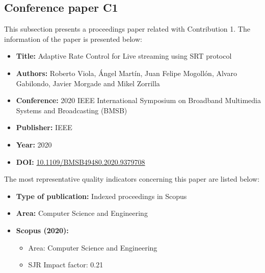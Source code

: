 \subsection{Conference paper C1}
\label{chap:BMSB2020}
This subsection presents a proceedings paper related with Contribution 1.
The information of the paper is presented below:
\begin{itemize} \itemsep1pt\parskip0pt
	\item \textbf{Title:} Adaptive Rate Control for Live streaming using SRT protocol
	\item \textbf{Authors:} Roberto Viola, \'Angel Mart\'in, Juan Felipe Mogoll\'on, Alvaro Gabilondo, Javier Morgade and Mikel Zorrilla
	\item \textbf{Conference:} 2020 IEEE International Symposium on Broadband Multimedia Systems and Broadcasting (BMSB)
	\item \textbf{Publisher:} IEEE
	\item \textbf{Year:} 2020
	\item \textbf{DOI:} \url{10.1109/BMSB49480.2020.9379708}
\end{itemize}
The most representative quality indicators concerning this paper are listed below:
\begin{itemize} \itemsep1pt\parskip0pt
	\item \textbf{Type of publication:} Indexed proceedings in Scopus
	\item \textbf{Area:} Computer Science and Engineering
	\item \textbf{Scopus (2020):}
	\begin{itemize}
		\item Area: Computer Science and Engineering
		\item SJR Impact factor: 0.21
	\end{itemize}
\end{itemize}


